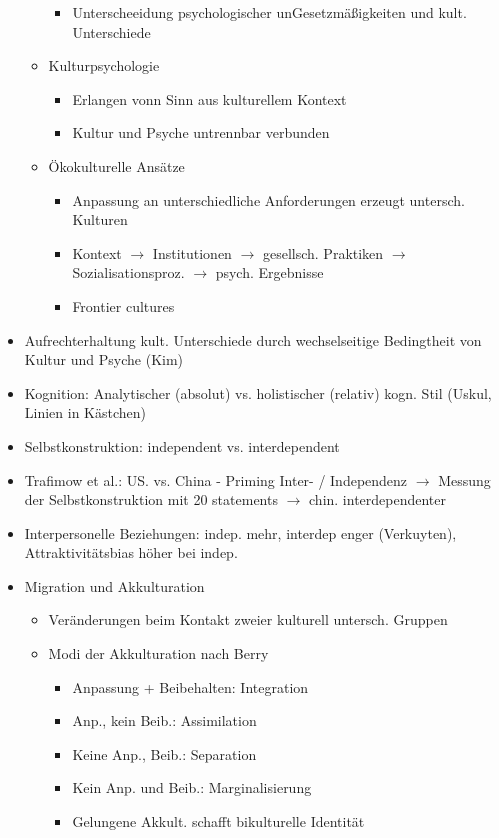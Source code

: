 \documentclass[11pt, paper=a4, twocolumn]{scrartcl}
\begin{document}
\begin{itemize}
\begin{itemize}
\begin{itemize}
							\item Unterscheeidung psychologischer unGesetzmäßigkeiten und kult. Unterschiede
						\end{itemize}
					\item Kulturpsychologie
						\begin{itemize}
							\item Erlangen vonn Sinn aus kulturellem Kontext
							\item Kultur und Psyche untrennbar verbunden
						\end{itemize}
					\item Ökokulturelle Ansätze
						\begin{itemize}
							\item Anpassung an unterschiedliche Anforderungen erzeugt untersch. Kulturen
							\item Kontext $\rightarrow$ Institutionen $\rightarrow$ gesellsch. Praktiken $\rightarrow$ 
								Sozialisationsproz. $\rightarrow$ psych. Ergebnisse
							\item Frontier cultures
						\end{itemize}
				\end{itemize}
			\item Aufrechterhaltung kult. Unterschiede durch wechselseitige Bedingtheit von Kultur und Psyche (Kim)
			\item Kognition: Analytischer (absolut) vs. holistischer (relativ) kogn. Stil (Uskul, Linien in Kästchen)
			\item Selbstkonstruktion: independent vs. interdependent
			\item Trafimow et al.: US. vs. China - Priming Inter- / Independenz $\rightarrow$ Messung der Selbstkonstruktion mit 20 
				statements $\rightarrow$ chin. interdependenter
			\item Interpersonelle Beziehungen: indep. mehr, interdep enger (Verkuyten), Attraktivitätsbias höher bei indep.
			\item Migration und Akkulturation
				\begin{itemize}
					\item Veränderungen beim Kontakt zweier kulturell untersch. Gruppen
					\item Modi der Akkulturation nach Berry
						\begin{itemize}
							\item Anpassung + Beibehalten: Integration
							\item Anp., kein Beib.: Assimilation
							\item Keine Anp., Beib.: Separation
							\item Kein Anp. und Beib.: Marginalisierung
							\item Gelungene Akkult. schafft bikulturelle Identität
						\end{itemize}
				\end{itemize}


		\end{itemize}
\end{document}
